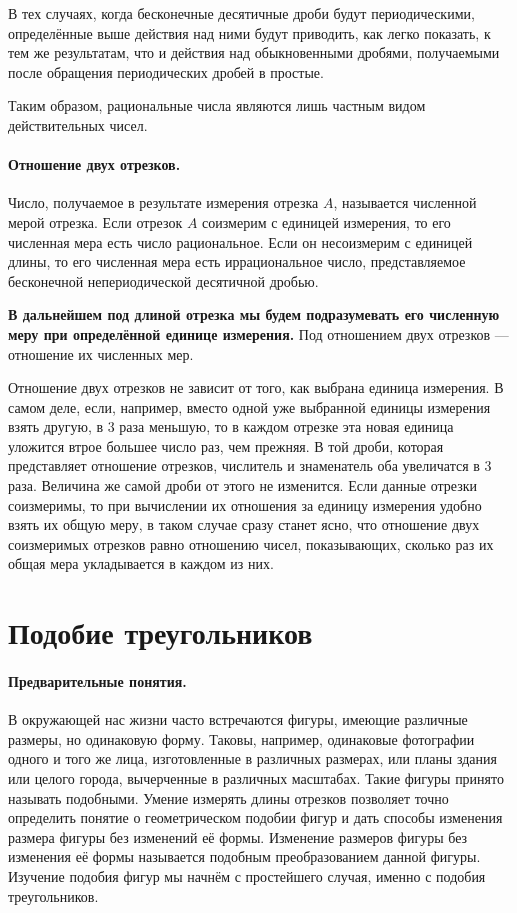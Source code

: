\documentclass[oneside]{book}
\begin{document}
В тех случаях, когда бесконечные десятичные дроби будут периодическими, определённые выше действия над ними будут приводить, как легко показать, к тем же результатам, что и действия над обыкновенными дробями, получаемыми после обращения периодических дробей в простые.

Таким образом, рациональные числа являются лишь частным видом действительных чисел.

\paragraph{Отношение двух отрезков.}\label{1938/155}
Число, получаемое в результате измерения отрезка $A$, называется численной мерой отрезка. %
Если отрезок $A$ соизмерим с единицей измерения, то его численная мера есть число рациональное.
Если он несоизмерим с единицей длины, то его численная мера есть иррациональное число, представляемое бесконечной непериодической десятичной дробью.

\textbf{В дальнейшем под длиной отрезка мы будем подразумевать его численную меру при определённой единице измерения.}
Под отношением двух отрезков — отношение их численных мер.

Отношение двух отрезков не зависит от того, как выбрана единица измерения.
В самом деле, если, например, вместо одной уже выбранной единицы измерения взять другую, в 3 раза меньшую, то в каждом отрезке эта новая единица уложится втрое большее число раз, чем прежняя.
В той дроби, которая представляет отношение отрезков, числитель и знаменатель оба увеличатся в 3 раза.
Величина же самой дроби от этого не изменится.
Если данные отрезки соизмеримы, то при вычислении их отношения за единицу измерения удобно взять их общую меру, в таком случае сразу станет ясно, что отношение двух соизмеримых отрезков равно отношению чисел, показывающих, сколько раз их общая мера укладывается в каждом из них. %


\section{Подобие треугольников}

\paragraph{Предварительные понятия.}\label{1938/156}
В окружающей нас жизни часто встречаются фигуры, имеющие различные размеры, но одинаковую форму.
Таковы, например, одинаковые фотографии одного и того же лица, изготовленные в различных размерах, или планы здания или целого города, вычерченные в различных масштабах. 
Такие фигуры принято называть подобными.
Умение измерять длины отрезков позволяет точно определить понятие о геометрическом подобии фигур и дать способы изменения размера фигуры без изменений её формы.
Изменение размеров фигуры без изменения её формы называется подобным преобразованием данной фигуры.
Изучение подобия фигур мы начнём с простейшего случая, именно с подобия треугольников.
\end{document}

